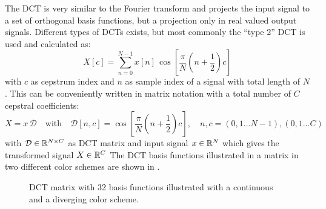 \FloatBarrier
\noindent
The DCT is very similar to the Fourier transform and projects the input signal to a set of orthogonal basis functions, but a projection only in real valued output signals.
Different types of DCTs exists, but most commonly the \enquote{type 2} DCT is used and calculated as:
\begin{equation}\label{eq:signal_mfcc_dct}
  X[c] = \sum_{n=0}^{N-1} x[n] \, \cos{\left[ \frac{\pi}{N} \left( n + \frac{1}{2} \right) c \right]}
\end{equation}
with $c$ as cepstrum index and $n$ as sample index of a signal with total length of $N$.
This can be conveniently written in matrix notation with a total number of $C$ cepstral coefficients:
\begin{equation}\label{eq:signal_mfcc_dct_matrix}
  X =  x \, \mathcal{D} \quad \mathrm{with} \quad \mathcal{D}[n, c] = \cos{\left[ \frac{\pi}{N} \left( n + \frac{1}{2} \right) c  \right]}, 
  \quad n, c = (0, 1 \dots N - 1), (0, 1 \dots C) 
\end{equation}
with $\mathcal{D} \in \mathbb{R}^{N \times C}$ as DCT matrix and input signal $x \in \mathbb{R}^N$ which gives the transformed signal $X \in \mathbb{R}^C$
The DCT basis functions illustrated in a matrix in two different color schemes are shown in .
\begin{figure}[!ht]
  \centering
  \quad
  \caption{DCT matrix with 32 basis functions illustrated with a continuous and a diverging color scheme.}
  \label{fig:signal_mfcc_dct}
\end{figure}
